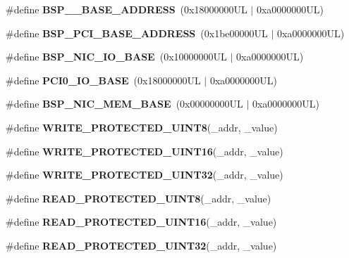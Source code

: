 \begin{DoxyCompactItemize}
\item 
\mbox{\label{group__RTEMSBSPsMIPSMalta_ga38e85860a1b14df257956afcbef08860}} 
\#define {\bfseries B\+S\+P\+\_\+\_\+\+B\+A\+S\+E\+\_\+\+A\+D\+D\+R\+E\+SS}~(0x18000000\+U\+L $\vert$ 0xa0000000\+U\+L)
\item 
\mbox{\label{group__RTEMSBSPsMIPSMalta_gaf83ae3dcd7ece42740ac0d626e0d0fdd}} 
\#define {\bfseries B\+S\+P\+\_\+\+P\+C\+I\+\_\+\+B\+A\+S\+E\+\_\+\+A\+D\+D\+R\+E\+SS}~(0x1be00000\+U\+L $\vert$ 0xa0000000\+U\+L)
\item 
\mbox{\label{group__RTEMSBSPsMIPSMalta_ga0430da829e2cb0c75907069438a933d0}} 
\#define {\bfseries B\+S\+P\+\_\+\+N\+I\+C\+\_\+\+I\+O\+\_\+\+B\+A\+SE}~(0x10000000\+U\+L $\vert$ 0xa0000000\+U\+L)
\item 
\mbox{\label{group__RTEMSBSPsMIPSMalta_ga4f9eb6ae2587ac486a0ad176828e0feb}} 
\#define {\bfseries P\+C\+I0\+\_\+\+I\+O\+\_\+\+B\+A\+SE}~(0x18000000\+U\+L $\vert$ 0xa0000000\+U\+L)
\item 
\mbox{\label{group__RTEMSBSPsMIPSMalta_ga40668cd66ce8327334d8d24cca3a01fe}} 
\#define {\bfseries B\+S\+P\+\_\+\+N\+I\+C\+\_\+\+M\+E\+M\+\_\+\+B\+A\+SE}~(0x00000000\+U\+L $\vert$ 0xa0000000\+U\+L)
\item 
\#define {\bfseries W\+R\+I\+T\+E\+\_\+\+P\+R\+O\+T\+E\+C\+T\+E\+D\+\_\+\+U\+I\+N\+T8}(\+\_\+addr,  \+\_\+value)
\item 
\#define {\bfseries W\+R\+I\+T\+E\+\_\+\+P\+R\+O\+T\+E\+C\+T\+E\+D\+\_\+\+U\+I\+N\+T16}(\+\_\+addr,  \+\_\+value)
\item 
\#define {\bfseries W\+R\+I\+T\+E\+\_\+\+P\+R\+O\+T\+E\+C\+T\+E\+D\+\_\+\+U\+I\+N\+T32}(\+\_\+addr,  \+\_\+value)
\item 
\#define {\bfseries R\+E\+A\+D\+\_\+\+P\+R\+O\+T\+E\+C\+T\+E\+D\+\_\+\+U\+I\+N\+T8}(\+\_\+addr,  \+\_\+value)
\item 
\#define {\bfseries R\+E\+A\+D\+\_\+\+P\+R\+O\+T\+E\+C\+T\+E\+D\+\_\+\+U\+I\+N\+T16}(\+\_\+addr,  \+\_\+value)
\item 
\#define {\bfseries R\+E\+A\+D\+\_\+\+P\+R\+O\+T\+E\+C\+T\+E\+D\+\_\+\+U\+I\+N\+T32}(\+\_\+addr,  \+\_\+value)
\item 
\mbox{\label{group__RTEMSBSPsMIPSMalta_ga779e98b2499926a96aebfa8afadca2ff}} 

\end{DoxyCompactItemize}
